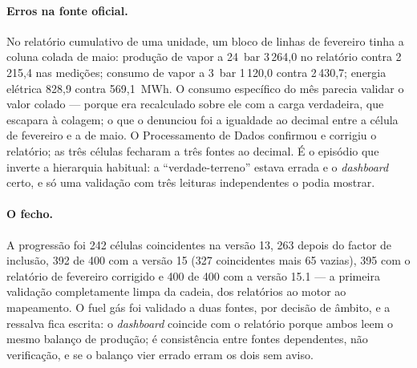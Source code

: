 \paragraph{Erros na fonte oficial.} No relatório cumulativo de uma
unidade, um bloco de linhas de fevereiro tinha a coluna colada de maio:
produção de vapor a 24~bar 3\,264,0 no relatório contra 2\,215,4 nas
medições; consumo de vapor a 3~bar 1\,120,0 contra 2\,430,7; energia
elétrica 828,9 contra 569,1~MWh. O consumo específico do mês parecia
validar o valor colado --- porque era recalculado sobre ele com a carga
verdadeira, que escapara à colagem; o que o denunciou foi a igualdade ao
decimal entre a célula de fevereiro e a de maio. O Processamento de Dados
confirmou e corrigiu o relatório; as três células fecharam a três fontes
ao decimal. É o episódio que inverte a hierarquia habitual: a
``verdade-terreno'' estava errada e o \emph{dashboard} certo, e só uma
validação com três leituras independentes o podia mostrar.

\paragraph{O fecho.} A progressão foi 242 células coincidentes na versão
13, 263 depois do factor de inclusão, 392 de 400 com a versão 15 (327
coincidentes mais 65 vazias), 395 com o relatório de fevereiro corrigido e
400 de 400 com a versão 15.1 --- a primeira validação completamente limpa
da cadeia, dos relatórios ao motor ao mapeamento.
O fuel gás foi validado a duas fontes, por decisão de âmbito, e a
ressalva fica escrita: o \emph{dashboard} coincide com o relatório porque
ambos leem o mesmo balanço de produção; é consistência entre fontes
dependentes, não verificação, e se o balanço vier errado erram os dois
sem aviso.

